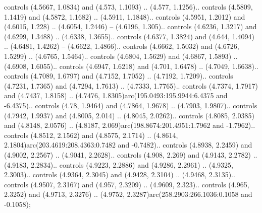 controls (4.5667, 1.0834) and (4.573, 1.1093) .. (4.577, 1.1256).. controls (4.5809, 1.1419) and (4.5872, 1.1682) .. (4.5911, 1.1848).. controls (4.5951, 1.2012) and (4.6015, 1.228) .. (4.6054, 1.2446) -- (4.6196, 1.305).. controls (4.6236, 1.3217) and (4.6299, 1.3488) .. (4.6338, 1.3655).. controls (4.6377, 1.3824) and (4.644, 1.4094) .. (4.6481, 1.4262) -- (4.6622, 1.4866).. controls (4.6662, 1.5032) and (4.6726, 1.5299) .. (4.6765, 1.5464).. controls (4.6804, 1.5629) and (4.6867, 1.5893) .. (4.6908, 1.6055).. controls (4.6947, 1.6218) and (4.701, 1.6478) .. (4.7049, 1.6638).. controls (4.7089, 1.6797) and (4.7152, 1.7052) .. (4.7192, 1.7209).. controls (4.7231, 1.7365) and (4.7294, 1.7613) .. (4.7333, 1.7765).. controls (4.7374, 1.7917) and (4.7437, 1.8158) .. (4.7476, 1.8305)arc(195.0493:195.9944:6.4375 and -6.4375).. controls (4.78, 1.9464) and (4.7864, 1.9678) .. (4.7903, 1.9807).. controls (4.7942, 1.9937) and (4.8005, 2.014) .. (4.8045, 2.0262).. controls (4.8085, 2.0385) and (4.8148, 2.0576) .. (4.8187, 2.069)arc(198.8674:201.4951:1.7962 and -1.7962).. controls (4.8512, 2.1562) and (4.8575, 2.1714) .. (4.8614, 2.1804)arc(203.4619:208.4363:0.7482 and -0.7482).. controls (4.8938, 2.2459) and (4.9002, 2.2567) .. (4.9041, 2.2628).. controls (4.908, 2.269) and (4.9143, 2.2782) .. (4.9183, 2.2834).. controls (4.9223, 2.2886) and (4.9286, 2.2961) .. (4.9325, 2.3003).. controls (4.9364, 2.3045) and (4.9428, 2.3104) .. (4.9468, 2.3135).. controls (4.9507, 2.3167) and (4.957, 2.3209) .. (4.9609, 2.323).. controls (4.965, 2.3252) and (4.9713, 2.3276) .. (4.9752, 2.3287)arc(258.2903:266.1036:0.1058 and -0.1058);



